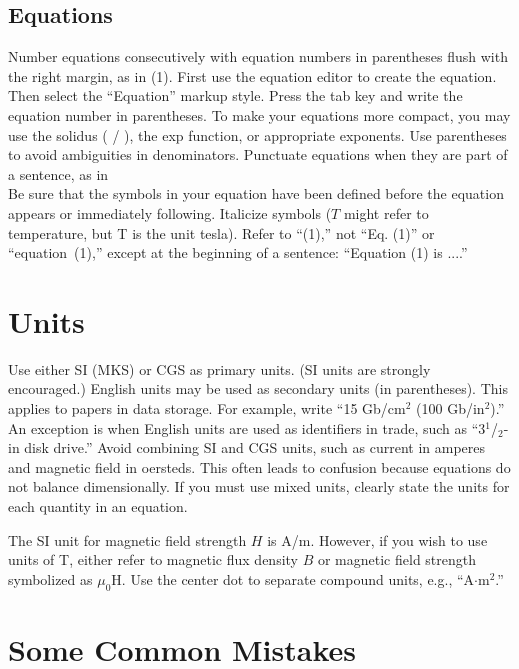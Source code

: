 \documentclass[journal]{IEEEtai}
\begin{document}
\subsection{Equations}

Number equations consecutively with equation numbers in parentheses flush with the right margin, as in (1). First use the equation editor to create the equation. Then select the ``Equation'' markup style. Press the tab key and write the equation number in parentheses. To make your equations more compact, you may use the solidus ( / ), the exp function, or appropriate exponents. Use parentheses to avoid ambiguities in denominators. Punctuate equations when they are part of a sentence, as in
\begin{equation}
\!
\end{equation}
Be sure that the symbols in your equation have been defined before the equation appears or immediately following. Italicize symbols ($T$ might refer to temperature, but T is the unit tesla). Refer to ``(1),'' not ``Eq. (1)'' or ``equation~(1),'' except at the beginning of a sentence: ``Equation (1) is ....''


\section{Units}

Use either SI (MKS) or CGS as primary units. (SI units are strongly encouraged.) English units may be used as secondary units (in parentheses). This applies to papers in data storage. For example, write ``15 Gb/cm$^2$ (100 Gb/in$^2$).'' An exception is when English units are used as identifiers in trade, such as ``3$^1${/}$_2$-in disk drive.'' Avoid combining SI and CGS units, such as current in amperes and magnetic field in oersteds. This often leads to confusion because equations do not balance dimensionally. If you must use mixed units, clearly state the units for each quantity in an equation.

The SI unit for magnetic field strength $H$ is A/m. However, if you wish to use units of T, either refer to magnetic flux density $B$ or magnetic field strength symbolized as $\mu_0$H. Use the center dot to separate compound units, e.g., ``A$\cdot$m$^2$.''

\section{Some Common Mistakes}
\end{document}
